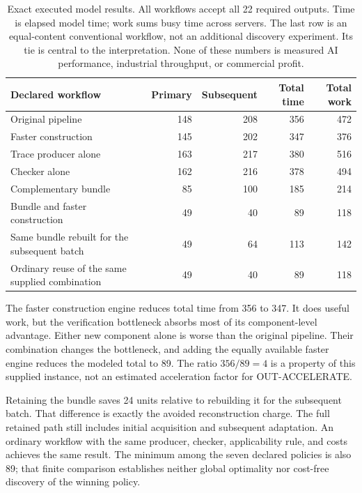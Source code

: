 \documentclass[11pt,letterpaper]{article}
\theoremstyle{remark}\newtheorem{remark}{Remark}[section]
\newcommand{\oa}{{\sffamily OUT-ACCELERATE}}
\begin{document}
\begin{table}[t]
\centering\small
\begin{tabularx}{\linewidth}{Yrrrr}
\toprule
Declared workflow & Primary & Subsequent & Total time & Total work\\
\midrule
Original pipeline & 148 & 208 & 356 & 472\\
Faster construction & 145 & 202 & 347 & 376\\
Trace producer alone & 163 & 217 & 380 & 516\\
Checker alone & 162 & 216 & 378 & 494\\
Complementary bundle & 85 & 100 & 185 & 214\\
Bundle and faster construction & 49 & 40 & 89 & 118\\
Same bundle rebuilt for the subsequent batch & 49 & 64 & 113 & 142\\
\midrule
Ordinary reuse of the same supplied combination & 49 & 40 & 89 & 118\\
\bottomrule
\end{tabularx}
\caption{Exact executed model results. All workflows accept all 22 required outputs.
Time is elapsed model time; work sums busy time across servers.
The last row is an equal-content conventional workflow, not an additional discovery experiment.
Its tie is central to the interpretation. None of these numbers is measured AI performance, industrial throughput, or commercial profit.}
\label{tab:results}
\end{table}

The faster construction engine reduces total time from 356 to 347.
It does useful work, but the verification bottleneck absorbs most of its component-level advantage.
Either new component alone is worse than the original pipeline.
Their combination changes the bottleneck, and adding the equally available faster engine reduces the modeled total to 89.
The ratio $356/89=4$ is a property of this supplied instance, not an estimated acceleration factor for \oa{}.

Retaining the bundle saves 24 units relative to rebuilding it for the subsequent batch.
That difference is exactly the avoided reconstruction charge.
The full retained path still includes initial acquisition and subsequent adaptation.
An ordinary workflow with the same producer, checker, applicability rule, and costs achieves the same result.
The minimum among the seven declared policies is also 89; that finite comparison establishes neither global optimality nor cost-free discovery of the winning policy.
\end{document}
